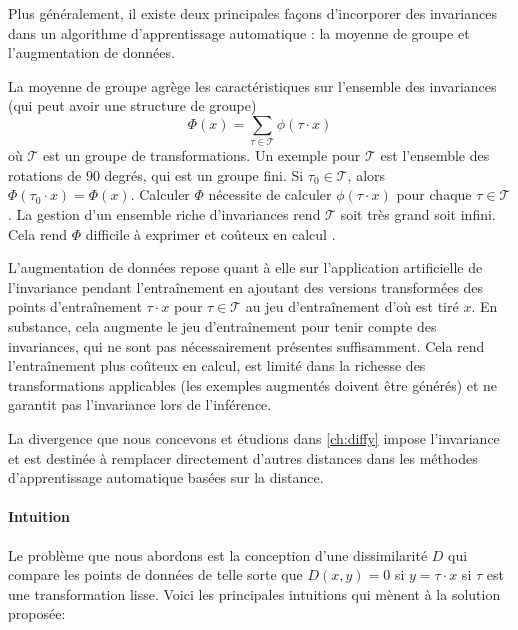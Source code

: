 Plus généralement, il existe deux principales façons d'incorporer des invariances dans un algorithme d'apprentissage automatique : la moyenne de groupe et l'augmentation de données.

La moyenne de groupe agrège les caractéristiques sur l'ensemble des invariances (qui peut avoir une structure de groupe)
\begin{equation}
    \Phi(x) = \sum_{\tau \in \mathcal T} \phi(\tau \cdot x)
\end{equation}
où $\mathcal T$ est un groupe de transformations. Un exemple pour $\mathcal T$ est l'ensemble des rotations de $90$ degrés, qui est un groupe fini. Si $\tau_0\in\mathcal T$, alors $\Phi(\tau_0 \cdot x) = \Phi(x)$. Calculer $\Phi$ nécessite de calculer $\phi(\tau \cdot x)$ pour chaque $\tau\in\mathcal T$. La gestion d'un ensemble riche d'invariances rend $\mathcal T$ soit très grand soit infini. Cela rend $\Phi$ difficile à exprimer et coûteux en calcul \cite{bietti}.

L'augmentation de données repose quant à elle sur l'application artificielle de l'invariance pendant l'entraînement en ajoutant des versions transformées des points d'entraînement $\tau \cdot x$ pour $\tau \in \mathcal T$ au jeu d'entraînement d'où est tiré $x$. En substance, cela augmente le jeu d'entraînement pour tenir compte des invariances, qui ne sont pas nécessairement présentes suffisamment. Cela rend l'entraînement plus coûteux en calcul, est limité dans la richesse des transformations applicables (les exemples augmentés doivent être générés) et ne garantit pas l'invariance lors de l'inférence.

La divergence que nous concevons et étudions dans \cref{ch:diffy} impose l'invariance et est destinée à remplacer directement d'autres distances dans les méthodes d'apprentissage automatique basées sur la distance.

\paragraph{Intuition}

Le problème que nous abordons est la conception d'une dissimilarité $D$ qui compare les points de données de telle sorte que $D(x, y) = 0$ si $y = \tau \cdot x$ si $\tau$ est une transformation lisse. Voici les principales intuitions qui mènent à la solution proposée:

